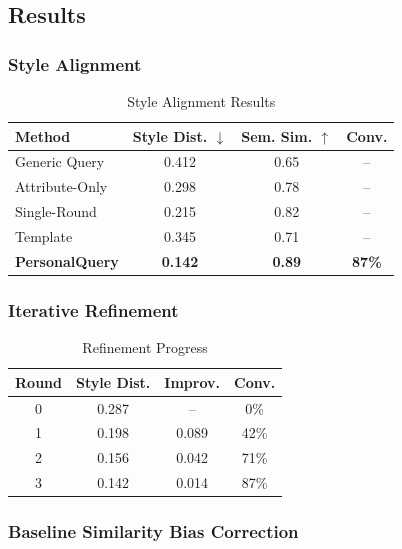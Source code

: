 \documentclass[11pt]{article}
\newcommand{\method}{PersonalQuery}
\begin{document}
\subsection{Results}

\subsubsection{Style Alignment}

\begin{table}[h]
\centering
\begin{tabular}{lccc}
\toprule
\textbf{Method} & \textbf{Style Dist.} $\downarrow$ & \textbf{Sem. Sim.} $\uparrow$ & \textbf{Conv.} \\
\midrule
Generic Query & 0.412 & 0.65 & -- \\
Attribute-Only & 0.298 & 0.78 & -- \\
Single-Round & 0.215 & 0.82 & -- \\
Template & 0.345 & 0.71 & -- \\
\midrule
\textbf{\method{}} & \textbf{0.142} & \textbf{0.89} & \textbf{87\%} \\
\bottomrule
\end{tabular}
\caption{Style Alignment Results}
\label{tab:style}
\end{table}

\subsubsection{Iterative Refinement}

\begin{table}[h]
\centering
\begin{tabular}{cccc}
\toprule
\textbf{Round} & \textbf{Style Dist.} & \textbf{Improv.} & \textbf{Conv.} \\
\midrule
0 & 0.287 & -- & 0\% \\
1 & 0.198 & 0.089 & 42\% \\
2 & 0.156 & 0.042 & 71\% \\
3 & 0.142 & 0.014 & 87\% \\
\bottomrule
\end{tabular}
\caption{Refinement Progress}
\label{tab:refinement}
\end{table}

\subsubsection{Baseline Similarity Bias Correction}
\end{document}
